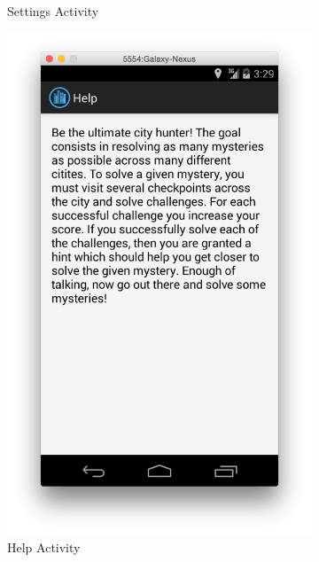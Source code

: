 \begin{figure}[H]
\begin{subfigure}[b]{0.3\textwidth}
                \caption{Settings Activity}
        \end{subfigure}
	\begin{subfigure}[b]{0.3\textwidth}
                \includegraphics[width=\textwidth]{Figures/HelpActivity}
                \caption{Help Activity}
        \end{subfigure}
	\begin{subfigure}[b]{0.3\textwidth}

\end{subfigure}
\end{figure}
